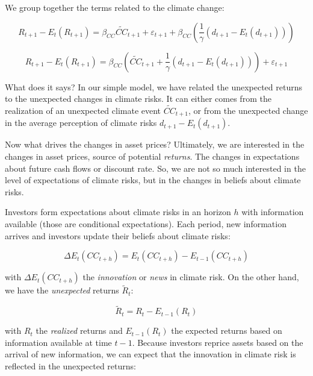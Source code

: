 We group together the terms related to the climate change:

\begin{equation}
    R_{t+1} - E_t(R_{t+1}) = \beta_{CC} \tilde{CC}_{t+1} + \varepsilon_{t+1} + \beta_{CC} \left( \frac{1}{\gamma}(d_{t+1} - E_t(d_{t+1})) \right)
\end{equation}

\begin{equation}
    R_{t+1} - E_t(R_{t+1}) = \beta_{CC} \left(\tilde{CC}_{t+1} + \frac{1}{\gamma}(d_{t+1} - E_t(d_{t+1})) \right) + \varepsilon_{t+1}
\end{equation}

What does it says? In our simple model, 
we have related the unexpected returns to the
unexpected changes in climate risks. It can 
either comes from the realization of an 
unexpected climate event $\tilde{CC}_{t+1}$,
or from the unexpected change in the average
perception of climate risks $d_{t+1} - E_t(d_{t+1})$.



Now what drives the changes in asset prices?
Ultimately, we are interested in the changes in asset prices,
source of potential \textit{returns}.
The changes in expectations about 
future cash flows or discount rate. 
So,
we are not so much interested in the level of
expectations of climate risks, but in the changes
in beliefs about climate risks.

Investors form expectations about climate risks
in an horizon $h$ with information available (those 
are conditional expectations).
Each period, new information arrives and investors
update their beliefs about climate risks:

\begin{equation}
    \Delta E_t (CC_{t+h}) = E_t(CC_{t+h}) - E_{t-1}(CC_{t+h})
\end{equation}

with $\Delta E_t (CC_{t+h})$ the \textit{innovation} or 
\textit{news} in climate risk. On the other hand, we have the \textit{unexpected} returns $\tilde{R}_t$:

\begin{equation}
    \tilde{R}_t = R_t - E_{t-1}(R_t)
\end{equation}

with $R_t$ the \textit{realized} returns 
and $E_{t-1}(R_t)$ the expected returns based on information available at time $t-1$.
Because investors reprice assets based on the arrival of new information,
we can expect that the innovation in climate risk is reflected in the unexpected returns:

